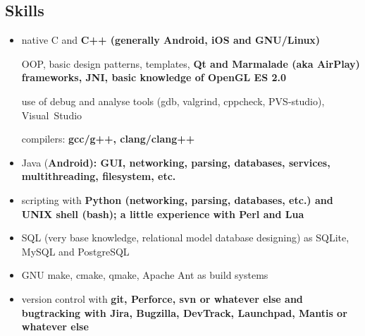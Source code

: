 \begin{flushright}

\fontsize{12pt}{13pt}\selectfont
\section{Skills}
\begin{itemize}

\item native C and \bfseries C++ \mdseries
(generally \bfseries Android\mdseries, iOS and \bfseries GNU/Linux\mdseries)

\subitem OOP, basic design patterns, templates,
\bfseries Qt \mdseries and
\bfseries Marmalade \mdseries (aka \bfseries AirPlay\mdseries) frameworks,
\bfseries JNI\mdseries,
basic knowledge of OpenGL ES 2.0

\subitem use of debug and analyse tools (gdb, valgrind, cppcheck, PVS-studio),
Visual~Studio

\subitem compilers: \bfseries gcc/g++\mdseries, clang/clang++

\item Java (\bfseries Android\mdseries): GUI, networking, parsing, databases, services, multithreading, filesystem, etc.

\item scripting with
\bfseries Python \mdseries (networking, parsing, databases, etc.)
and
\bfseries UNIX shell (bash)\mdseries;
a little experience with
\bfseries Perl \mdseries and \bfseries Lua\mdseries

\item SQL (very base knowledge, relational model database designing)
as SQLite, MySQL and PostgreSQL

\item GNU make, cmake, qmake, Apache Ant as build systems

\item version control with \bfseries git\mdseries, Perforce, svn or whatever else
and bugtracking with Jira, Bugzilla, DevTrack, Launchpad, Mantis or whatever else

\end{itemize}


\end{flushright}
